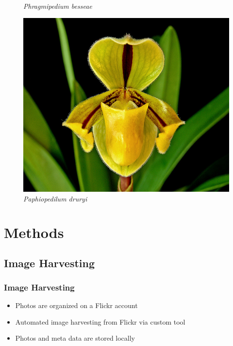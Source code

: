 \documentclass[]{beamer}
\begin{document}
\begin{frame}
\begin{figure}[!htb]
              \caption*{\textit{Phragmipedium besseae}}
            \endminipage\hfill
              \includegraphics[width=\linewidth]{Paphiopedilum_druryi}
              \caption*{\textit{Paphiopedilum druryi}}
            \endminipage\hfill
        \end{figure}
    \end{frame}


\section{Methods}

    \subsection{Image Harvesting}

    \begin{frame}
        \frametitle{Image Harvesting}

        \begin{itemize}
            \item Photos are organized on a Flickr account
            \item Automated image harvesting from Flickr via custom tool
            \item Photos and meta data are stored locally
        \end{itemize}
    \end{frame}
\end{document}
